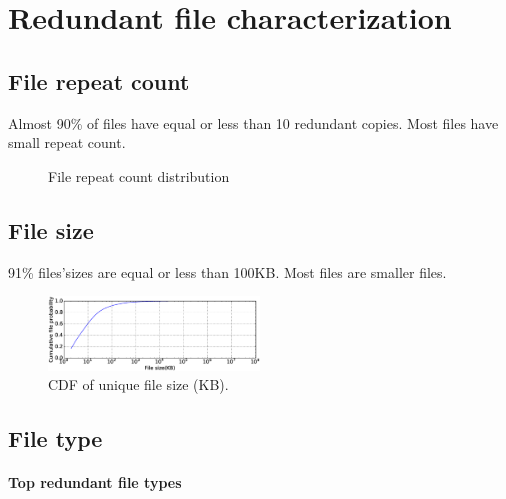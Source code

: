 \section{Redundant file characterization}
\label{sec:redundant_files}

\subsection{File repeat count}

Almost 90\% of files have equal or less than 10 redundant copies. Most files have small repeat count.

\begin{figure}
	\centering
	\caption{File repeat count distribution}
	\label{fig:file_repeat_count}
\end{figure}

\subsection{File size}

91\% files'sizes are equal or less than 100KB. Most files are smaller files.

\begin{figure}
	\centering
	\includegraphics[width=0.5\textwidth]{graphs/File_size-KB.eps}
	\caption{CDF of unique file size (KB).
	}
	\label{fig:file_size}
\end{figure}

\subsection{File type}

\paragraph{Top redundant file types}

